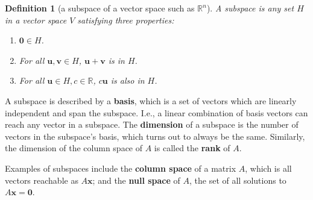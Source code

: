 \documentclass[draft,12pt]{report}
\newtheorem{definition}{Definition}
\renewcommand{\vec}[1]{\mathbf{#1}}
\begin{document}
\begin{definition}[a subspace of a vector space such as $\mathbb R^n$]
    A subspace is any set $H$ in a vector space $V$ satisfying three properties:
    \begin{enumerate}
        \item $\vec{0} \in H$.
        \item For all $\vec{u}, \vec{v} \in H$, $\vec{u} + \vec{v}$ is in $H$.
        \item For all $\vec{u} \in H, c \in \mathbb R$, $c\vec{u}$ is also in $H$.
    \end{enumerate}
\end{definition}
\noindent
A subspace is described by a \textbf{basis}, which is a set of vectors which are linearly independent and span the subspace. I.e., a linear combination of basis vectors can reach any vector in a subspace. The \textbf{dimension} of a subspace is the number of vectors in the subspace's basis, which turns out to always be the same. Similarly, the dimension of the column space of $A$ is called the \textbf{rank} of $A$.

Examples of subspaces include the \textbf{column space} of a matrix $A$, which is all vectors reachable as $A\vec{x}$; and the \textbf{null space} of $A$, the set of all solutions to $A\vec{x} = \vec{0}$.
\end{document}
